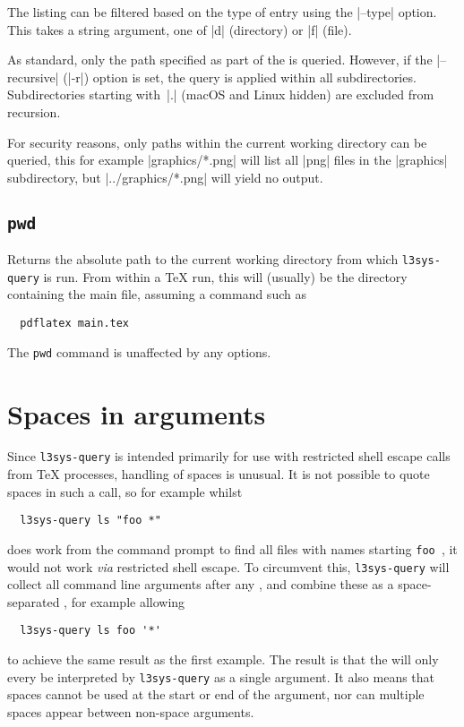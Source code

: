 \documentclass{l3doc}
\begin{document}
\begin{documentation}
The listing can be filtered based on the type of entry using the |--type|
option. This takes a string argument, one of |d| (directory) or |f| (file).

As standard, only the path specified as part of the  is queried.
However, if the |--recursive| (|-r|) option is set, the query is applied within
all subdirectories. Subdirectories starting with~|.| (macOS and Linux hidden)
are excluded from recursion.

For security reasons, only paths within the current working directory can be
queried, this for example |graphics/*.png| will list all |png| files in the
|graphics| subdirectory, but |../graphics/*.png| will yield no output.

\subsection{\texttt{pwd}}

Returns the absolute path to the current working directory from which
\texttt{l3sys-query} is run. From within a \TeX{} run, this will (usually) be
the directory containing the main file, assuming a command such as
\begin{verbatim}
  pdflatex main.tex
\end{verbatim}
The \texttt{pwd} command is unaffected by any options.

\section{Spaces in arguments}

Since \texttt{l3sys-query} is intended primarily for use with restricted shell
escape calls from \TeX{} processes, handling of spaces is unusual. It is not
possible to quote spaces in such a call, so for example whilst
\begin{verbatim}
  l3sys-query ls "foo *"
\end{verbatim}
does work from the command prompt to find all files with names starting
\verb*|foo |, it would not work \emph{via} restricted shell escape. To
circumvent this, \texttt{l3sys-query} will collect all command line arguments
after any , and combine these as a space-separated ,
for example allowing
\begin{verbatim}
  l3sys-query ls foo '*'
\end{verbatim}
to achieve the same result as the first example. The result is that the
 will only every be interpreted by \texttt{l3sys-query} as a single
argument. It also means that spaces cannot be used at the start or end of the
argument, nor can multiple spaces appear between non-space arguments.


\end{documentation}
\end{document}
